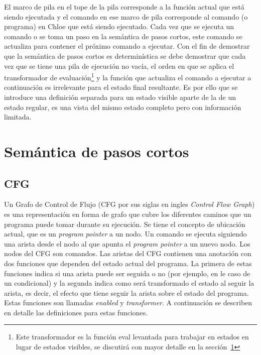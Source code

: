 El marco de pila en el tope de la pila corresponde a la función actual que está siendo ejecutada y el comando en ese marco de pila corresponde al comando (o programa) en Chloe que está siendo ejecutado.
Cada vez que se ejecuta un comando o se toma un paso en la semántica de pasos cortos, este comando se actualiza para contener el próximo comando a ejecutar.
Con el fin de demostrar que la semántica de pasos cortos es determinística se debe demostrar que cada vez que se tiene una pila de ejecución no vacía, el orden en que se aplica el transformador de evaluación\footnote{Este transformador es la función eval levantada para trabajar en estados en lugar de estados visibles, se discutirá con mayor detalle en la sección~\ref{section:small_step} } y la función que actualiza el comando a ejecutar a continuación es irrelevante para el estado final resultante.
Es por ello que se introduce una definición separada para un estado visible aparte de la de un estado regular, es una vista del mismo estado completo pero con información limitada.

\section{Semántica de pasos cortos}\label{section:small_step}

\begin{comment}
add a little summary here.
\end{comment}

\subsection{CFG}\label{subsection:cfg}

Un Grafo de Control de Flujo (CFG por sus siglas en ingles \textit{Control Flow Graph}) es una representación en forma de grafo que cubre los diferentes caminos que un programa puede tomar durante su ejecución.
Se tiene el concepto de ubicación actual, que es un \textit{program pointer} a un nodo.
Un comando se ejecuta siguiendo una arista desde el nodo al que apunta el \textit{program pointer} a un nuevo nodo.
Los nodos del CFG son comandos.
Las aristas del CFG contienen una anotación con dos funciones que dependen del estado actual del programa.
La primera de estas funciones indica si una arista puede ser seguida o no (por ejemplo, en le caso de un condicional) y la segunda indica como será transformado el estado al seguir la arista, es decir, el efecto que tiene seguir la arista sobre el estado del programa.
Estas funciones son llamadas \textit{enabled} y \textit{transformer}.
A continuación se describen en detalle las definiciones para estas funciones.


